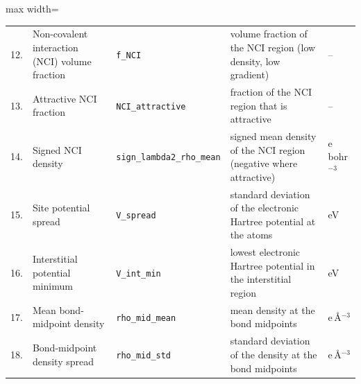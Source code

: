 \documentclass[journal=jctcce,manuscript=article,email=true]{achemso}
\begin{document}
\begin{table}[!tp]
\begin{adjustbox}{max width=\textwidth}
\begin{tabular}{@{}r>{\raggedright\arraybackslash}p{3.7cm}l>{\raggedright\arraybackslash}p{5.4cm}l@{}}
12. & Non-covalent interaction (NCI) volume fraction & \texttt{f\_NCI} & volume fraction of the NCI region (low density, low gradient) & -- \\
13. & Attractive NCI fraction & \texttt{NCI\_attractive} & fraction of the NCI region that is attractive & -- \\
14. & Signed NCI density & \texttt{sign\_lambda2\_rho\_mean} & signed mean density of the NCI region (negative where attractive) & e\,bohr$^{-3}$ \\
15. & Site potential spread & \texttt{V\_spread} & standard deviation of the electronic Hartree potential at the atoms & eV \\
16. & Interstitial potential minimum & \texttt{V\_int\_min} & lowest electronic Hartree potential in the interstitial region & eV \\
17. & Mean bond-midpoint density & \texttt{rho\_mid\_mean} & mean density at the bond midpoints & e\,\AA$^{-3}$ \\
18. & Bond-midpoint density spread & \texttt{rho\_mid\_std} & standard deviation of the density at the bond midpoints & e\,\AA$^{-3}$ \\
\bottomrule
\end{tabular}
\end{adjustbox}
\end{table}
\end{document}
